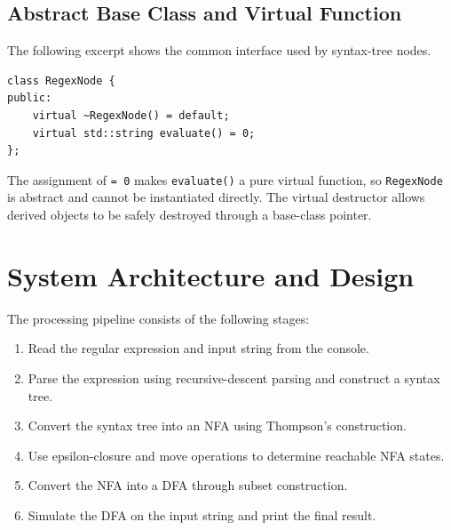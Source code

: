 \documentclass[12pt,a4paper]{report}
\begin{document}
\subsection{Abstract Base Class and Virtual Function}
The following excerpt shows the common interface used by syntax-tree nodes.
\begin{lstlisting}
class RegexNode {
public:
    virtual ~RegexNode() = default;
    virtual std::string evaluate() = 0;
};
\end{lstlisting}
The assignment of \texttt{= 0} makes \texttt{evaluate()} a pure virtual function, so \texttt{RegexNode} is abstract and cannot be instantiated directly. The virtual destructor allows derived objects to be safely destroyed through a base-class pointer.

\section{System Architecture and Design}
The processing pipeline consists of the following stages:
\begin{enumerate}
    \item Read the regular expression and input string from the console.
    \item Parse the expression using recursive-descent parsing and construct a syntax tree.
    \item Convert the syntax tree into an NFA using Thompson's construction.
    \item Use epsilon-closure and move operations to determine reachable NFA states.
    \item Convert the NFA into a DFA through subset construction.
    \item Simulate the DFA on the input string and print the final result.
\end{enumerate}
\end{document}
